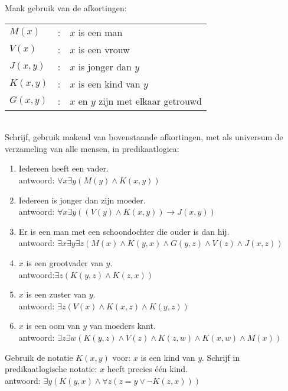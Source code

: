 \begin{answer} %
Maak gebruik van de afkortingen:

\begin{tabular}{lcl}
$M(x)$&:&$x$ is een man\\
$V(x)$&:&$x$ is een vrouw\\
$J(x,y)$&:&$x$ is jonger dan $y$\\
$K(x,y)$&:&$x$ is een kind van $y$\\
$G(x,y)$&:&$x$ en $y$ zijn met elkaar getrouwd
\end{tabular}\\
Schrijf, gebruik makend van bovenstaande afkortingen, met als universum de verzameling van alle mensen, in predikaatlogica:
\begin{enumerate}[label=\arabic*.]
    \item Iedereen heeft een vader. \\
    antwoord: $\forall x \exists y (M(y) \land K(x, y))$
    \item Iedereen is jonger dan zijn moeder. \\
    antwoord: $\forall x \exists y ((V(y) \land K(x, y)) \rightarrow J(x,y)) $
    \item Er is een man met een schoondochter die ouder is dan hij. \\
    antwoord: $\exists x \exists y \exists z(M(x)\land K(y,x) \land G(y,z) \land V(z) \land J(x,z))$
    \item $x$ is een grootvader van $y$. \\
    antwoord:$\exists z (K(y,z) \land K(z,x))$
    \item $x$ is een zuster van $y$.\\
    antwoord: $\exists z (V(x) \land K(x,z) \land K(y,z))$
    \item $x$ is een oom van $y$ van moeders kant. \\
    antwoord: $\exists z \exists w (K(y, z) \land V(z) \land K(z, w) \land K(x, w) \land M(x))$
\end{enumerate}
\end{answer}

\begin{answer} %
Gebruik de notatie $K(x,y)$ voor: $x$ is een kind van $y$. Schrijf in predikaatlogische notatie: $x$ heeft precies \'e\'en kind. \\
antwoord: $\exists y(K(y,x) \land \forall z (z = y \lor \neg K(z,x))) $
\end{answer}

